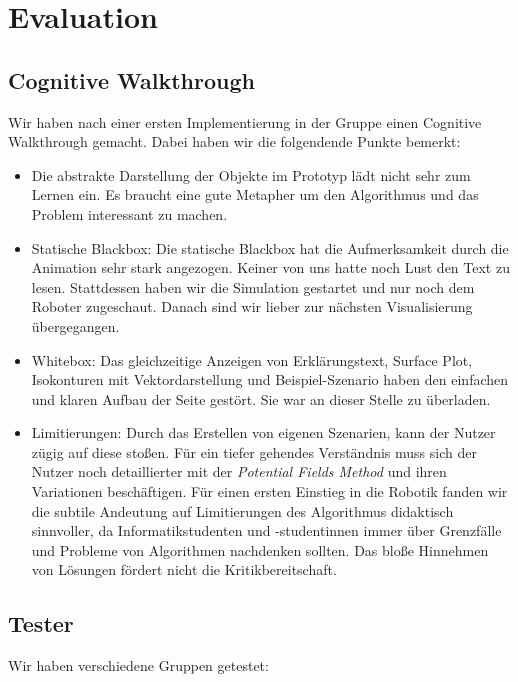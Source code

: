 \section{Evaluation}


\subsection{Cognitive Walkthrough}\label{sec:cogWal}
Wir haben nach einer ersten Implementierung in der Gruppe einen Cognitive Walkthrough gemacht. Dabei haben wir die folgendende Punkte bemerkt:
\begin{itemize}
	\item Die abstrakte Darstellung der Objekte im Prototyp lädt nicht sehr zum Lernen ein. Es braucht eine gute Metapher um den Algorithmus und das Problem interessant zu machen.
	\item Statische Blackbox: Die statische Blackbox hat die Aufmerksamkeit durch die Animation sehr stark angezogen. Keiner von uns hatte noch Lust den Text zu lesen. Stattdessen haben wir die Simulation gestartet und nur noch dem Roboter zugeschaut. Danach sind wir lieber zur nächsten Visualisierung übergegangen.
	\item Whitebox: Das gleichzeitige Anzeigen von Erklärungstext, Surface Plot, Isokonturen mit Vektordarstellung und Beispiel-Szenario haben den einfachen und klaren Aufbau der Seite gestört. Sie war an dieser Stelle zu überladen.
	\item Limitierungen: Durch das Erstellen von eigenen Szenarien, kann der Nutzer zügig auf diese stoßen. Für ein tiefer gehendes Verständnis muss sich der Nutzer noch detaillierter mit der \textit{Potential Fields Method} und ihren Variationen beschäftigen. Für einen ersten Einstieg in die Robotik fanden wir die subtile Andeutung auf Limitierungen des Algorithmus didaktisch sinnvoller, da Informatikstudenten und -studentinnen immer über Grenzfälle und Probleme von Algorithmen nachdenken sollten. Das bloße Hinnehmen von Lösungen fördert nicht die Kritikbereitschaft.
\end{itemize}

\subsection{Tester}

Wir haben verschiedene Gruppen getestet:

